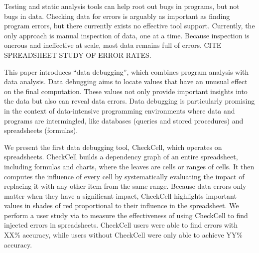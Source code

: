 Testing and static analysis tools can help root out bugs in programs,
but not bugs in data. Checking data for errors is arguably as
important as finding program errors, but there currently exists no
effective tool support. Currently, the only approach is manual
inspection of data, one at a time. Because inspection is onerous and
ineffective at scale, most data remains full of errors. CITE
SPREADSHEET STUDY OF ERROR RATES.

This paper introduces ``data debugging'', which combines program
analysis with data analysis. Data debugging aims to locate values that
have an unusual effect on the final computation.  These values not
only provide important insights into the data but also can reveal data
errors.  Data debugging is particularly promising in the context of
data-intensive programming environments where data and programs are
intermingled, like databases (queries and stored procedures) and
spreadsheets (formulas).

We present the first data debugging tool, CheckCell, which operates on
spreadsheets. CheckCell builds a dependency graph of an entire
spreadsheet, including formulas and charts, where the leaves are cells
or ranges of cells. It then computes the influence of every cell by
systematically evaluating the impact of replacing it with any other
item from the same range. Because data errors only matter when they
have a significant impact, CheckCell highlights important values in
shades of red proportional to their influence in the spreadsheet.  We
perform a user study via to measure the effectiveness of using
CheckCell to find injected errors in spreadsheets. CheckCell users
were able to find errors with XX\% accuracy, while users without
CheckCell were only able to achieve YY\% accuracy.
